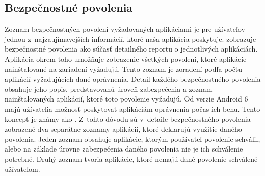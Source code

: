\subsection{Bezpečnostné povolenia}
Zoznam bezpečnostných povolení vyžadovaných aplikáciami je pre užívateľov jednou z~najzaujímavejších informácií, ktoré naša aplikácia poskytuje.  zobrazuje bezpečnostné povolenia ako súčasť detailného reportu o jednotlivých aplikáciách. Aplikácia okrem toho umožňuje zobrazenie všetkých povolení, ktoré aplikácie nainštalované na zariadení vyžadujú. Tento zoznam je zoradení podľa počtu aplikácií vyžadujúcich dané oprávnenia. Detail každého bezpečnostného povolenia obsahuje jeho popis, predstavovanú úroveň zabezpečenia a zoznam nainštalovaných aplikácií, ktoré toto povolenie vyžadujú. Od verzie Android 6 majú užívatelia možnosť poskytovať aplikáciám oprávnenia počas ich behu. Tento koncept je známy ako . Z~tohto dôvodu sú v~detaile bezpečnostného povolenia zobrazené dva separátne zoznamy aplikácií, ktoré deklarujú využitie daného povolenia. Jeden zoznam obsahuje aplikácie, ktorým používateľ povolenie schválil, alebo na základe úrovne zabezpečenia daného povolenia nie je ich schválenie potrebné. Druhý zoznam tvoria aplikácie, ktoré nemajú dané povolenie schválené užívateľom. \\ \\

